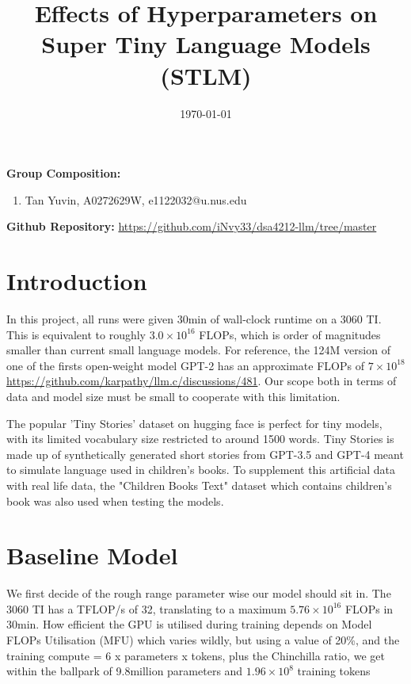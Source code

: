 \documentclass[12pt]{article}
\begin{document}
\title{Effects of Hyperparameters on Super Tiny Language Models (STLM)}
\date{\today}
\maketitle

{\bf Group Composition:}
\begin{enumerate}
\item Tan Yuvin, A0272629W, e1122032@u.nus.edu
\end{enumerate}

{\bf Github Repository:} \url{https://github.com/iNvy33/dsa4212-llm/tree/master}

%
%
\section{Introduction}


In this project, all runs were given 30min of wall-clock runtime on a 3060 TI. This is equivalent to roughly $3.0\times10^{16}$ FLOPs, which is order of magnitudes smaller than current small language models. For reference, the 124M version of one of the firsts open-weight model GPT-2 has an approximate FLOPs of $7\times10^{18}$ \url{https://github.com/karpathy/llm.c/discussions/481}. Our scope both in terms of data and model size must be small to cooperate with this limitation. 
\newline

The popular 'Tiny Stories' dataset on hugging face is perfect for tiny models, with its limited vocabulary size restricted to around 1500 words. Tiny Stories is made up of synthetically generated short stories from GPT-3.5 and GPT-4 meant to simulate language used in children's books. To supplement this artificial data with real life data, the "Children Books Text" dataset which contains children's book was also used when testing the models. 

\section{Baseline Model}

We first decide of the rough range parameter wise our model should sit in. The 3060 TI has a TFLOP/s of 32, translating to a maximum $5.76\times10^{16}$ FLOPs in 30min. How efficient the GPU is utilised during training depends on Model FLOPs Utilisation (MFU) which varies wildly, but using a value of 20\%, and the training compute = 6 x parameters x tokens, plus the Chinchilla ratio, we get within the ballpark of 9.8million parameters and $1.96\times10^8$ training tokens
\newline
\end{document}
